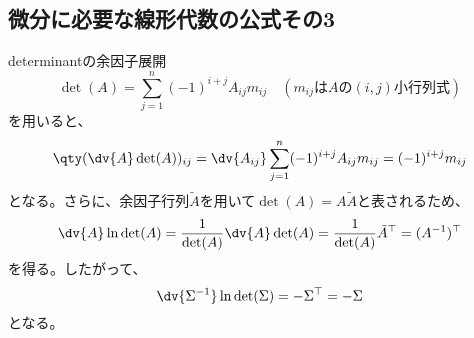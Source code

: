 \documentclass[a4paper,11pt,uplatex]{jsarticle}%
\begin{document}
\subsection{微分に必要な線形代数の公式その3}
determinantの余因子展開
\begin{equation}
  \det(A) = \sum_{j=1}^{n}(-1)^{i+j}A_{ij}m_{ij}\quad(m_{ij}\text{は$A\text{の}(i,j)$小行列式})
\end{equation}
を用いると、
\begin{equation}
  \qty(\dv{A}\det(A))_{ij} = \dv{A_{ij}}\sum_{j=1}^{n}(-1)^{i+j}A_{ij}m_{ij}=(-1)^{i+j}m_{ij}
\end{equation}
となる。さらに、余因子行列$\tilde{A}$を用いて$\det(A) = A\tilde{A}$と表されるため、
\begin{equation}
  \dv{A}\ln{\det(A)} = \frac{1}{\det(A)}\dv{A}\det(A) = \frac{1}{\det(A)}\tilde{A}^{\top} = (A^{-1})^{\top}
\end{equation}
を得る。したがって、
\begin{equation}
  \dv{\Sigma^{-1}}\ln{\det(\Sigma)} = -\Sigma^{\top} = -\Sigma
\end{equation}
となる。
\end{document}
